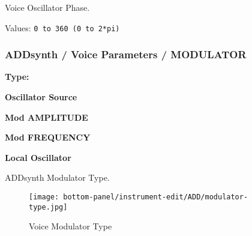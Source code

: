    Voice Oscillator Phase.

   Values: \texttt{0 to 360 (0 to 2*pi)}







\subsubsection{ADDsynth / Voice Parameters / MODULATOR}
\label{subsubsec:addsynth_voice_parameters_modulator}

   \begin{enumber}
      \item \textbf{Type:}
      \item \textbf{Oscillator Source}
      \item \textbf{Mod AMPLITUDE}
      \item \textbf{Mod FREQUENCY}
      \item \textbf{Local Oscillator}
   \end{enumber}

   \setcounter{ItemCounter}{0}      %

   ADDsynth Modulator Type.

\begin{figure}[H]
   \centering
   \texttt{[image: bottom-panel/instrument-edit/ADD/modulator-type.jpg]}
   \caption{Voice Modulator Type}
   \label{fig:voice_modulator_type}
\end{figure}

